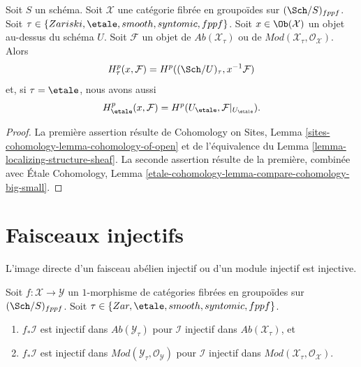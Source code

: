 \begin{lemma}
\label{lemma-cohomology-restriction}
Soit $S$ un schéma. Soit $\mathcal{X}$ une catégorie fibrée en groupoïdes
sur $(\Sch/S)_{fppf}$. Soit $\tau \in \{Zariski, \etale, smooth,
syntomic, fppf\}$. Soit $x \in \Ob(\mathcal{X})$ un objet au-dessus
du schéma $U$. Soit $\mathcal{F}$
un objet de $\textit{Ab}(\mathcal{X}_\tau)$ ou de
$\textit{Mod}(\mathcal{X}_\tau, \mathcal{O}_\mathcal{X})$. Alors
$$
H^p_\tau(x, \mathcal{F}) = H^p((\Sch/U)_\tau, x^{-1}\mathcal{F})
$$
et, si $\tau = \etale$, nous avons aussi
$$
H^p_\etale(x, \mathcal{F}) =
H^p(U_\etale, \mathcal{F}|_{U_\etale}).
$$
\end{lemma}

\begin{proof}
La première assertion résulte de
Cohomology on Sites, Lemma \ref{sites-cohomology-lemma-cohomology-of-open}
et de l'équivalence du
Lemma \ref{lemma-localizing-structure-sheaf}.
La seconde assertion résulte de la première, combinée avec
Étale Cohomology, Lemma
\ref{etale-cohomology-lemma-compare-cohomology-big-small}.
\end{proof}














\section{Faisceaux injectifs}
\label{section-lower-shriek}

\noindent
L'image directe d'un faisceau abélien injectif ou d'un module injectif est injective.

\begin{lemma}
\label{lemma-pushforward-injective}
Soit $f : \mathcal{X} \to \mathcal{Y}$ un $1$-morphisme de catégories
fibrées en groupoïdes sur $(\Sch/S)_{fppf}$. Soit
$\tau \in \{Zar, \etale, smooth, syntomic, fppf\}$.
\begin{enumerate}
\item $f_*\mathcal{I}$ est injectif dans $\textit{Ab}(\mathcal{Y}_\tau)$
pour $\mathcal{I}$ injectif dans $\textit{Ab}(\mathcal{X}_\tau)$, et
\item $f_*\mathcal{I}$ est injectif dans
$\textit{Mod}(\mathcal{Y}_\tau, \mathcal{O}_\mathcal{Y})$
pour $\mathcal{I}$ injectif dans
$\textit{Mod}(\mathcal{X}_\tau, \mathcal{O}_\mathcal{X})$.
\end{enumerate}
\end{lemma}

